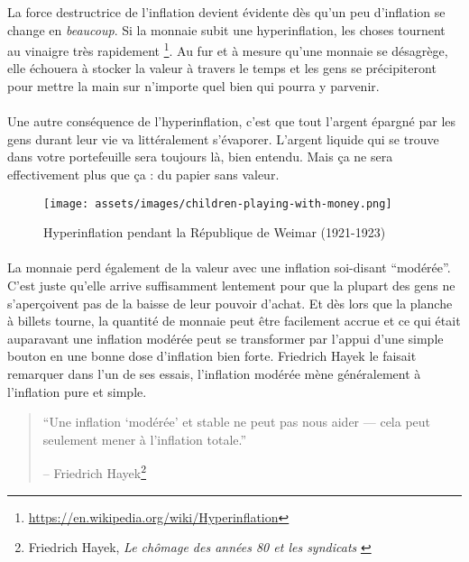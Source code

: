 La force destructrice de l'inflation devient évidente dès qu'un peu d'inflation
se change en \textit{beaucoup}. Si la monnaie subit une hyperinflation, les
choses tournent au vinaigre très rapidement
\footnote{\url{https://en.wikipedia.org/wiki/Hyperinflation}\cite{wiki:hyperinflation}}.
Au fur et à mesure qu'une monnaie se désagrège, elle échouera à stocker la
valeur à travers le temps et les gens se précipiteront pour mettre la main sur
n'importe quel bien qui pourra y parvenir.

\paragraph{}
Une autre conséquence de l'hyperinflation, c'est que tout l'argent épargné par
les gens durant leur vie va littéralement s'évaporer. L'argent liquide qui se
trouve dans votre portefeuille sera toujours là, bien entendu. Mais ça ne sera
effectivement plus que ça : du papier sans valeur.

\begin{figure}
  \texttt{[image: assets/images/children-playing-with-money.png]}
  \caption{Hyperinflation pendant la République de Weimar (1921-1923)}
  \label{fig:children-playing-with-money}
\end{figure}

\paragraph{}
La monnaie perd également de la valeur avec une inflation soi-disant
\enquote{modérée}. C'est juste qu'elle arrive suffisamment lentement pour que la
plupart des gens ne s'aperçoivent pas de la baisse de leur pouvoir d'achat. Et
dès lors que la planche à billets tourne, la quantité de monnaie peut être
facilement accrue et ce qui était auparavant une inflation modérée peut se
transformer par l'appui d'une simple bouton en une bonne dose d'inflation bien
forte. Friedrich Hayek le faisait remarquer dans l'un de ses essais, l'inflation
modérée mène généralement à l'inflation pure et simple.

\begin{quotation}\begin{samepage}
\enquote{Une inflation `modérée' et stable ne peut pas nous aider --- cela peut
seulement mener à l'inflation totale.}
\begin{flushright} -- Friedrich Hayek\footnote{Friedrich Hayek, \textit{Le
chômage des années 80 et les syndicats} \cite{hayek-inflation}}
\end{flushright}\end{samepage}\end{quotation}

